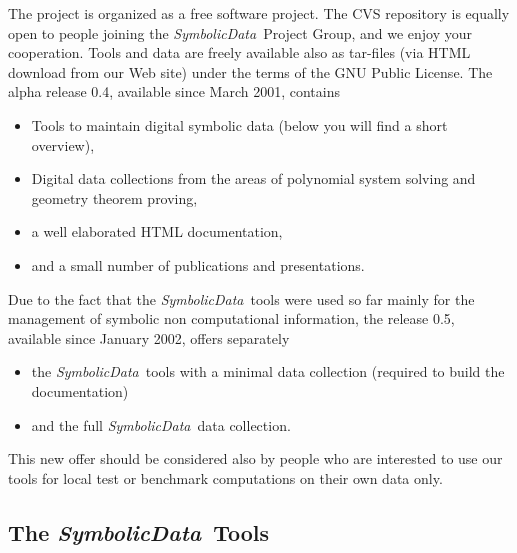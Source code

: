 \documentclass[11pt]{article}
\newcommand{\SD}{{\em Symbo\-lic\-Data}}
\begin{document}
The project is organized as a free software project. The CVS
repository is equally open to people joining the \SD\ Project Group,
and we enjoy your cooperation. Tools and data are freely available
also as tar-files (via HTML download from our Web site) under the
terms of the GNU Public License.  The alpha release 0.4, available
since March 2001, contains
\begin{itemize}\itemsep-2pt
\item Tools to maintain digital symbolic data (below you will find a
short over\-view),
\item Digital data collections from the areas of polynomial
system solving and geometry theorem proving,
\item a well elaborated HTML documentation,
\item and a small number of publications and presentations.
\end{itemize}
Due to the fact that the \SD\ tools were used so far mainly for
the management of symbolic non computational information, the
release 0.5, available since January 2002, offers separately 
\begin{itemize}\itemsep-2pt
\item the \SD\ tools with a minimal data collection (required to build
the documentation)
\item and the full \SD\ data collection. 
\end{itemize}
This new offer should be considered also by people who are interested
to use our tools for local test or benchmark computations on their own
data only.

\subsection{The \SD\ Tools}
\end{document}
